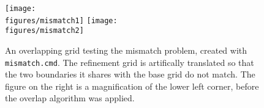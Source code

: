 

\begin{figure}[hbt]
  \begin{center}
   \texttt{[image: \\figures/mismatch1]}
   \texttt{[image: \\figures/mismatch2]}
  \end{center}
  \caption{An overlapping grid testing the mismatch problem, created with {\tt mismatch.cmd}. 
        The refinement grid is artifically translated so that the two boundaries it shares with the base grid do not match.
        The figure on the right is a magnification of the lower left corner, before the overlap algorithm was applied.}
        \label{fig:mismatchCorner}
\end{figure}


